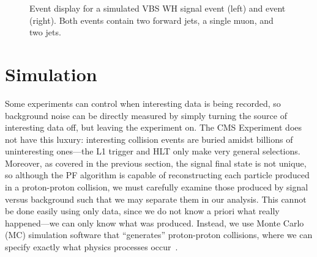 \begin{figure}[htb]
    \centering
    \qquad
    \caption{
        Event display for a simulated VBS WH signal event (left) and \ttbar event (right). 
        Both events contain two forward jets, a single muon, and two \PQb jets. 
    }
    \label{fig:vbs_vs_ttbar}
\end{figure}

\section{Simulation}
Some experiments can control when interesting data is being recorded, so background noise can be directly measured by simply turning the source of interesting data off, but leaving the experiment on. 
The CMS Experiment does not have this luxury: interesting collision events are buried amidst billions of uninteresting ones---the L1 trigger and HLT only make very general selections. 
Moreover, as covered in the previous section, the signal final state is not unique, so although the PF algorithm is capable of reconstructing each particle produced in a proton-proton collision, we must carefully examine those produced by signal versus background such that we may separate them in our analysis. 
This cannot be done easily using only data, since we do not know a priori what really happened---we can only know what was produced. 
Instead, we use Monte Carlo (MC) simulation software that ``generates'' proton-proton collisions, where we can specify exactly what physics processes occur~\cite{Buckley:2011ms}. 


